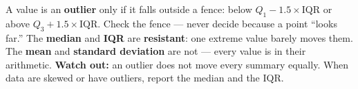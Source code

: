 \documentclass[12pt]{article}
\begin{document}
\vspace{0.14in}

\begin{remindbox}
\small
A value is an \textbf{outlier} only if it falls outside a fence: below $Q_1 - 1.5 \times
\text{IQR}$ or above $Q_3 + 1.5 \times \text{IQR}$. Check the fence --- never decide because a
point ``looks far.'' The \textbf{median} and \textbf{IQR} are \textbf{resistant}: one extreme
value barely moves them. The \textbf{mean} and \textbf{standard deviation} are not --- every
value is in their arithmetic. \textbf{Watch out:} an outlier does not move every summary
equally. When data are skewed or have outliers, report the median and the IQR.
\end{remindbox}
\end{document}
